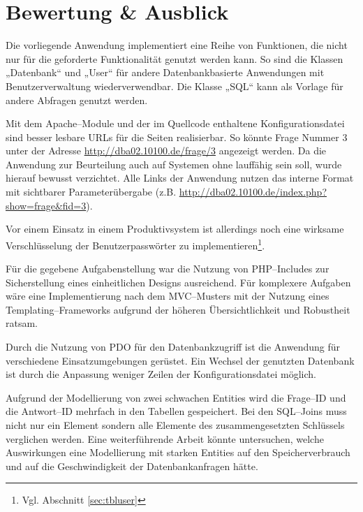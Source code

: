 \section{Bewertung \& Ausblick}

Die vorliegende Anwendung implementiert eine Reihe von Funktionen, die nicht nur für die geforderte Funktionalität genutzt werden kann. So sind die Klassen „Datenbank“ und „User“ für andere Datenbankbasierte Anwendungen mit Benutzerverwaltung wiederverwendbar. Die Klasse „SQL“ kann als Vorlage für andere Abfragen genutzt werden.

Mit dem Apache--Module  und der im Quellcode enthaltene Konfigurationsdatei  sind besser lesbare URLs für die Seiten realisierbar. So könnte Frage Nummer 3 unter der Adresse \url{http://dba02.10100.de/frage/3} angezeigt werden. Da die Anwendung zur Beurteilung auch auf Systemen ohne  lauffähig sein soll, wurde hierauf bewusst verzichtet. Alle Links der Anwendung nutzen das interne Format mit sichtbarer Parameterübergabe (z.B. \url{http://dba02.10100.de/index.php?show=frage&fid=3}). 

Vor einem Einsatz in einem Produktivsystem ist allerdings noch eine wirksame Verschlüsselung der Benutzerpasswörter zu implementieren\footnote{Vgl. Abschnitt \ref{sec:tbluser}}.

Für die gegebene Aufgabenstellung war die Nutzung von PHP--Includes zur Sicherstellung eines einheitlichen Designs ausreichend. Für komplexere Aufgaben wäre eine Implementierung nach dem MVC--Musters mit der Nutzung eines Temp\-lating--Frame\-works aufgrund der höheren Übersichtlichkeit und Robustheit ratsam.

Durch die Nutzung von PDO für den Datenbankzugriff ist die Anwendung für verschiedene Einsatzumgebungen gerüstet. Ein Wechsel der genutzten Datenbank ist durch die Anpassung weniger Zeilen der Konfigurationsdatei möglich.

Aufgrund der Modellierung von zwei schwachen Entities wird die Frage--ID und die Antwort--ID mehrfach in den Tabellen gespeichert. Bei den SQL--Joins muss nicht nur ein Element sondern alle Elemente des zusammengesetzten Schlüssels verglichen werden. Eine weiterführende Arbeit könnte untersuchen, welche Auswirkungen eine Modellierung mit starken Entities auf den Speicherverbrauch und auf die Geschwindigkeit der Datenbankanfragen hätte.